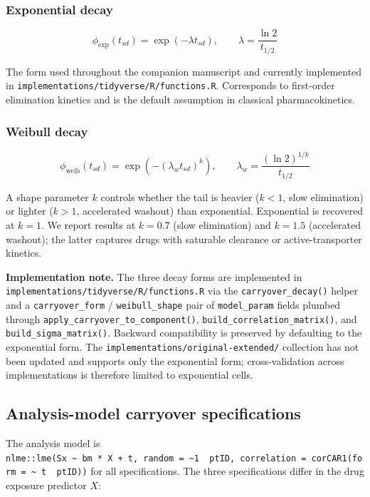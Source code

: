 \documentclass[
]{article}
\begin{document}
\subsubsection{Exponential decay}\label{exponential-decay}

\[
\phi_{\text{exp}}(t_{sd}) =
  \exp\left(-\lambda t_{sd}\right), \qquad
  \lambda = \frac{\ln 2}{t_{1/2}}
\]

The form used throughout the companion manuscript and currently
implemented in \texttt{implementations/tidyverse/R/functions.R}.
Corresponds to first-order elimination kinetics and is the
default assumption in classical pharmacokinetics.

\subsubsection{Weibull decay}\label{weibull-decay}

\[
\phi_{\text{weib}}(t_{sd}) =
  \exp\left(-\left(\lambda_w t_{sd}\right)^{k}\right), \qquad
  \lambda_w = \frac{(\ln 2)^{1/k}}{t_{1/2}}
\]

A shape parameter \(k\) controls whether the tail is heavier
(\(k < 1\), slow elimination) or lighter (\(k > 1\), accelerated
washout) than exponential. Exponential is recovered at \(k = 1\).
We report results at \(k = 0.7\) (slow elimination) and \(k = 1.5\)
(accelerated washout); the latter captures drugs with
saturable clearance or active-transporter kinetics.

\textbf{Implementation note.} The three decay forms are implemented
in \texttt{implementations/tidyverse/R/functions.R} via the
\texttt{carryover\_decay()} helper and a \texttt{carryover\_form} / \texttt{weibull\_shape}
pair of \texttt{model\_param} fields plumbed through
\texttt{apply\_carryover\_to\_component()}, \texttt{build\_correlation\_matrix()},
and \texttt{build\_sigma\_matrix()}. Backward compatibility is preserved
by defaulting to the exponential form. The
\texttt{implementations/original-extended/} collection has not been
updated and supports only the exponential form; cross-validation
across implementations is therefore limited to exponential cells.

\subsection{Analysis-model carryover specifications}\label{analysis-model-carryover-specifications}

The analysis model is \texttt{nlme::lme(Sx\ \textasciitilde{}\ bm\ *\ X\ +\ t,\ random\ =\ \textasciitilde{}1\ \textbar{}\ ptID,\ correlation\ =\ corCAR1(form\ =\ \textasciitilde{}\ t\ \textbar{}\ ptID))} for all
specifications. The three specifications differ in the drug
exposure predictor \(X\):
\end{document}
